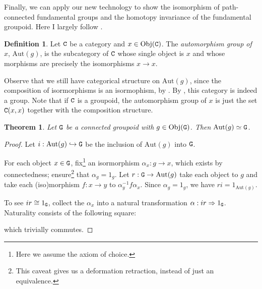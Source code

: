 \documentclass[11 pt]{amsart}
\theoremstyle{plain}   %
\newtheorem{thm}{Theorem}[section] %
\theoremstyle{definition}
\newtheorem{defn}{Definition}[section]
\theoremstyle{remark}
\numberwithin{equation}{section}
\def\nat{\Rightarrow}
\def\Aut{\text{Aut}}
\newcommand{\punctuation}[1]{\makebox[0pt][l]{#1}}
\newcommand{\cat}[1]{{\normalfont\texttt{#1}}}
\newcommand{\Obj}[1]{\text{Obj}(\cat{#1})}
\begin{document}
Finally, we can apply our new technology to show the isomorphism of
path-connected fundamental groups and the homotopy invariance of the fundamental
groupoid. Here I largely follow \cite[Section 6.5]{Brown}.

\begin{defn}
	Let $\cat{C}$ be a category and $x\in \Obj{C}$. The \emph{automorphism group
		of $x$}, $\Aut(g)$, is the subcategory of $\cat{C}$ whose single object is $x$ and whose
	morphisms are precisely the isomorphisms $x\rightarrow x$.
\end{defn}

Observe that we still have categorical structure on $\Aut(g)$, since the
composition of isormorphisms is an isormophism, by . By , this category is indeed a group. Note that if
$\cat{C}$ is a groupoid, the automorphism group of $x$ is just the set
$\cat{C}(x, x)$ together with the composition structure.

\begin{thm}\label{groupoids retract}
	Let $\cat{G}$  be a connected groupoid with $g\in\Obj{G}$. Then
	$\Aut(g)\simeq\cat{G}$.
\end{thm}

\begin{proof}
	Let $i: \Aut(g)\hookrightarrow\cat{G}$ be the inclusion of $\Aut(g)$ into
	$\cat{G}$.

	For each object $x\in\cat{G}$, fix\footnote{Here we assume the axiom of
		choice.} an isormorphism $\alpha_x: g\rightarrow x$, which exists by
	connectedness; ensure\footnote{This caveat gives us a deformation
		retraction, instead of just an equivalence.} that $\alpha_g = 1_g$. Let $r:
		\cat{G}\rightarrow\Aut(g)$ take each object to $g$ and take each (iso)morphism
	$f: x\rightarrow y$ to $\alpha_y^{-1}f\alpha_x$. Since $\alpha_g = 1_g$, we have
	$ri = 1_{\Aut(g)}$.

	To see $ir\cong 1_\cat{G}$, collect the $\alpha_x$ into a natural transformation
	$\alpha: ir\nat1_\cat{G}$. Naturality consists of the following square:
	\begin{figure}[H]
		\centering
	\end{figure}
	which trivially commutes.
\end{proof}
\end{document}
